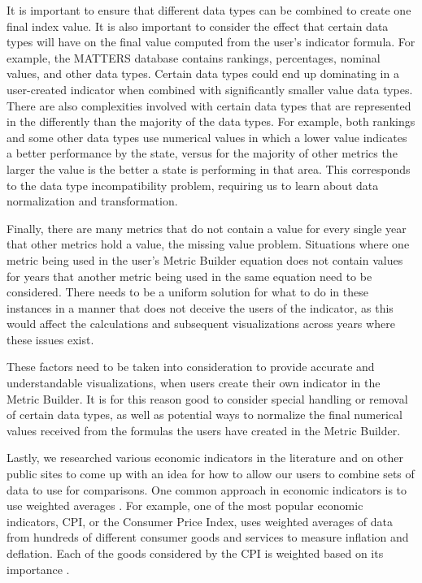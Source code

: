 		It is important to ensure that different data types can be combined to 
		create one final index value. It is also important to consider the 
		effect that certain data types will have on the final value computed 
		from the user's indicator formula. For example, the MATTERS database 
		contains rankings, percentages, nominal values, and other data types. 
		Certain data types could end up dominating in a user-created indicator 
		when combined with significantly smaller value data types. There are 
		also complexities involved with certain data types that are represented 
		in the differently than the majority of the data types. For example, both 
		rankings and some other data types use numerical values in which a lower 
		value indicates a better performance by the state, versus for the 
		majority of other metrics the larger the value is the better a state is 
		performing in that area. This corresponds to the data type 
		incompatibility problem, requiring us to learn about data normalization 
		and transformation. 

		Finally, there are many metrics that do not contain a value for every 
		single year that other metrics hold a value, the missing value problem. 
		Situations where one metric being used in the user's Metric Builder 
		equation does not contain values for years that another metric being 
		used in the same equation need to be considered. There needs to be a 
		uniform solution for what to do in these instances in a manner that does 
		not deceive the users of the indicator, as this would affect the 
		calculations and subsequent visualizations across years where these 
		issues exist.

		These factors need to be taken into consideration to provide accurate 
		and understandable visualizations, when users create their own indicator 
		in the Metric Builder. It is for this reason good to consider special 
		handling or removal of certain data types, as well as potential ways to 
		normalize the final numerical values received from the formulas the 
		users have created in the Metric Builder.

		Lastly, we researched various economic indicators in the literature and 
		on other public sites to come up with an idea for how to allow our users 
		to combine sets of data to use for comparisons. One common approach in 
		economic indicators is to use weighted averages \cite{weightedaverage}. 
		For example, one of the most popular economic indicators, CPI, or the 
		Consumer Price Index, uses weighted averages of data from hundreds of 
		different consumer goods and services to measure inflation and 
		deflation. Each of the goods considered by the CPI is weighted based on 
		its importance \cite{cpi}.

